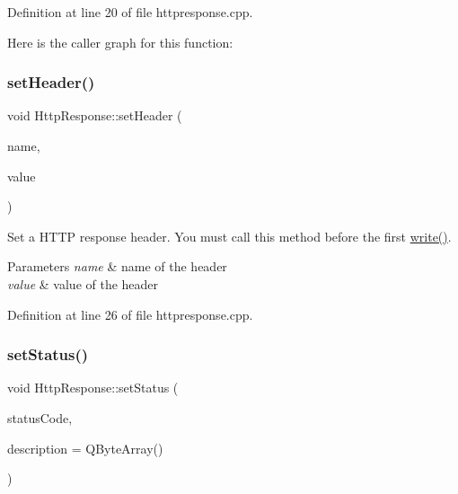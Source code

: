 Definition at line 20 of file httpresponse.\+cpp.

Here is the caller graph for this function\+:
\mbox{\label{classstefanfrings_1_1_http_response_ae725069b38ab629f33c9bb6391b4c064}} 
\subsubsection{\texorpdfstring{set\+Header()}{setHeader()}\hspace{0.1cm}{\footnotesize\ttfamily [2/2]}}
{\footnotesize\ttfamily void Http\+Response\+::set\+Header (\begin{DoxyParamCaption}\item[{Q\+Byte\+Array}]{name,  }\item[{int}]{value }\end{DoxyParamCaption})}

Set a H\+T\+TP response header. You must call this method before the first \mbox{\hyperlink{classstefanfrings_1_1_http_response_a6e49919cc568835ca6d81fec02533260}{write()}}. 
\begin{DoxyParams}{Parameters}
{\em name} & name of the header \\
\hline
{\em value} & value of the header \\
\hline
\end{DoxyParams}


Definition at line 26 of file httpresponse.\+cpp.

\mbox{\label{classstefanfrings_1_1_http_response_a07af281f6437c377e6f729051ce4e13c}} 
\subsubsection{\texorpdfstring{set\+Status()}{setStatus()}}
{\footnotesize\ttfamily void Http\+Response\+::set\+Status (\begin{DoxyParamCaption}\item[{int}]{status\+Code,  }\item[{Q\+Byte\+Array}]{description = {\ttfamily QByteArray()} }\end{DoxyParamCaption})}

